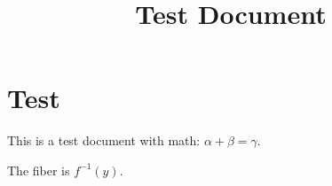 \documentclass{article}
\title{Test Document}
\author{}
\date{}
\begin{document}
\maketitle

\section{Test}

This is a test document with math: $\alpha + \beta = \gamma$.

The fiber is $f^{-1}(y)$.
\end{document}
